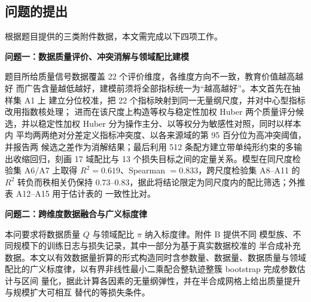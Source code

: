 \documentclass[bwprint]{gmcmthesis}
\numberwithin{equation}{section}
\numberwithin{figure}{section}
\numberwithin{table}{section}
\begin{document}
%
%

\subsection{问题的提出}


根据题目提供的三类附件数据，本文需完成以下四项工作。

\textbf{问题一：数据质量评价、冲突消解与领域配比建模}

题目所给质量信号数据覆盖 22 个评价维度，各维度方向不一致，教育价值越高越好
而广告含量越低越好，建模前须将全部指标统一为“越高越好”。本文首先在抽样集 A1 上
建立分位校准，把 22 个指标映射到同一无量纲尺度，并对中心型指标改用指数核处理；
进而在该尺度上构造等权与稳定性加权 Huber 两个质量评分候选，并以稳定性加权 Huber
分为操作主分、以等权分为敏感性对照，同时以样本内
平均两两绝对分差定义指标冲突度、以各来源域的第 95 百分位为高冲突阈值，并报告两
候选之差作为消解结果；最后利用 512 条配方建立带单纯形约束的多输出收缩回归，刻画
17 域配比与 13 个损失目标之间的定量关系。模型在同尺度检验集 A6/A7 上取得
$R^2=0.619$、Spearman $=0.833$，跨尺度检验集 A8--A11 的 $R^2$ 转负而秩相关仍保持
$0.73$--$0.83$，据此将结论限定为同尺度内的配比筛选；外推表 A12--A15 用于估计表的
一致性比对。

\textbf{问题二：跨维度数据融合与广义标度律}

本问要求将数据质量 $Q$ 与领域配比 $\pi$ 纳入标度律。附件 B 提供不同
模型族、不同规模下的训练日志与损失记录，其中一部分为基于真实数据校准的
半合成补充数据。本文以有效数据量折算的形式构造同时含参数量、数据量、数据质量与领域
配比的广义标度律，以有界非线性最小二乘配合整轨迹整簇 bootstrap 完成参数估计与区间
量化，据此计算各因素的无量纲弹性，并在半合成网格上给出质量提升与规模扩大可相互
替代的等损失条件。
\end{document}
